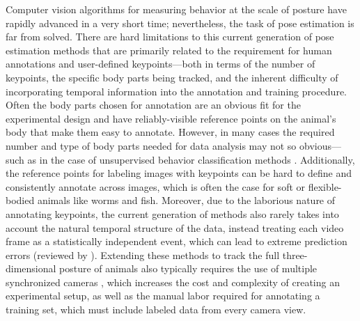 \documentclass[11pt,a4paper,oneside]{book}
\begin{document}
\begin{doublespace}
Computer vision algorithms for measuring behavior at the scale of posture have rapidly advanced in a very short time; nevertheless, the task of pose estimation is far from solved. There are hard limitations to this current generation of pose estimation methods that are primarily related to the requirement for human annotations and user-defined keypoints---both in terms of the number of keypoints, the specific body parts being tracked, and the inherent difficulty of incorporating temporal information into the annotation and training procedure. Often the body parts chosen for annotation are an obvious fit for the experimental design and have reliably-visible reference points on the animal's body that make them easy to annotate. However, in many cases the required number and type of body parts needed for data analysis may not so obvious---such as in the case of unsupervised behavior classification methods \citep{berman2014mapping, pereira2019fast}. Additionally, the reference points for labeling images with keypoints can be hard to define and consistently annotate across images, which is often the case for soft or flexible-bodied animals like worms and fish. Moreover, due to the laborious nature of annotating keypoints, the current generation of methods also rarely takes into account the natural temporal structure of the data, instead treating each video frame as a statistically independent event, which can lead to extreme prediction errors (reviewed by \citealt{seethapathi2019movement}). Extending these methods to track the full three-dimensional posture of animals also typically requires the use of multiple synchronized cameras \citep{nath2018, gunel2019deepfly3d}, which increases the cost and complexity of creating an experimental setup, as well as the manual labor required for annotating a training set, which must include labeled data from every camera view.


\end{doublespace}
\end{document}
